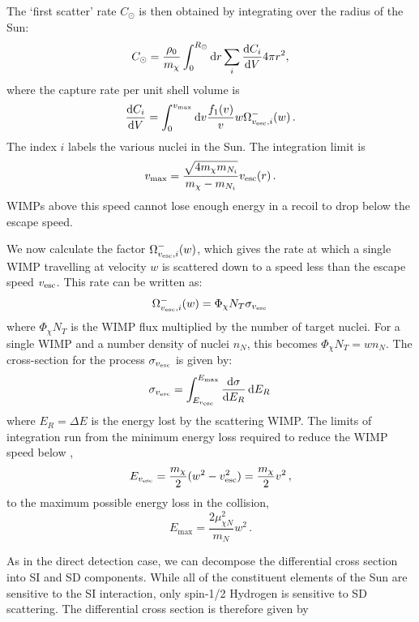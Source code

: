 The `first scatter' rate $C_{\odot}$ is then obtained by integrating over the radius of the Sun:
\begin{equation}
C_{\odot} = \frac{\rho_0}{m_\chi} \int_{0}^{R_{\odot}} \textrm{d}r \sum_i \frac{\mathrm{d}C_i}{\mathrm{d}V} 4 \pi r^{2},
\end{equation}
where the capture rate per unit shell volume is
\begin{equation}
\label{eq:NT:dCdV}
\dbd{C_i}{V} = \int_{0}^{v_{\textrm{max}}} \textrm{d}v \frac{f_1(v)}{v} w \ScatRate\,.
\end{equation}
The index \(i\) labels the various nuclei in the Sun. The integration limit is
\begin{equation}
v_{\textrm{max}} = \frac{\sqrt{4m_\chi m_{N_i}}}{m_\chi - m_{N_i}}\vesc(r)\,.
\end{equation}
WIMPs above this speed cannot lose enough energy in a recoil to drop below the escape speed.

We now calculate the factor $\ScatRate$, which gives the rate at which a single WIMP travelling at velocity \(w\) is scattered down to a speed less than the escape speed \(\vesc\). This rate can be written as:
\begin{equation}
\ScatRate = \Phi_\chi N_T \sigma_{\vesc}\,
\end{equation}
where \(\Phi_\chi N_T\) is the WIMP flux multiplied by the number of target nuclei. For a single WIMP and a number density of nuclei \(n_N\), this becomes \( \Phi_\chi N_T = w n_N\). The cross-section for the process \(\sigma_{\vesc}\) is given by:
\begin{equation}
\label{eq:NT:sigma}
\sigma_{\vesc}  = \int_{E_{\vesc}}^{E_\textrm{max}} \dbd{\sigma}{E_R} \, \textrm{d}E_R\,
\end{equation}
where \(E_R = \Delta E\) is the energy lost by the scattering WIMP. The limits of integration run from the minimum energy loss required to reduce the WIMP speed below \vesc,
\begin{equation}
E_{\vesc} = \frac{m_\chi}{2}(w^2 - \vesc^2) = \frac{m_\chi}{2}v^2\,,
\end{equation}
to the maximum possible energy loss in the collision,
\begin{equation}
E_\textrm{max} = \frac{2 \mu_{\chi N}^2}{m_N} w^2\,.
\end{equation}

As in the direct detection case, we can decompose the differential cross section into SI and SD components. While all of the constituent elements of the Sun are sensitive to the SI interaction, only spin-1/2 Hydrogen is sensitive to SD scattering. The differential cross section is therefore given by

